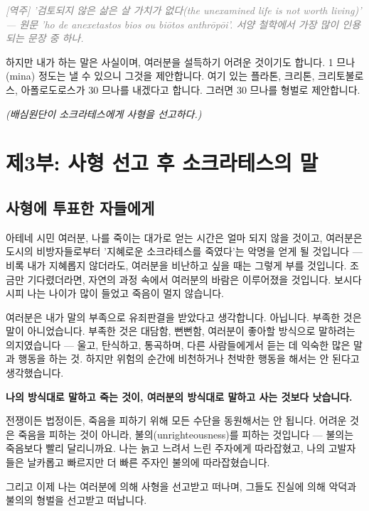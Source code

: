 \documentclass[11pt, a4paper]{article}
\newcommand{\tnote}[1]{\par\noindent\textit{\textcolor{gray}{[역주] #1}}\par\smallskip}
\begin{document}
\tnote{'검토되지 않은 삶은 살 가치가 없다(the unexamined life is not worth living)' — 원문 'ho de anexetastos bios ou biōtos anthrōpōi'. 서양 철학에서 가장 많이 인용되는 문장 중 하나.}


하지만 내가 하는 말은 사실이며, 여러분을 설득하기 어려운 것이기도 합니다. 1 므나(mina) 정도는 낼 수 있으니 그것을 제안합니다. 여기 있는 플라톤, 크리톤, 크리토불로스, 아폴로도로스가 30 므나를 내겠다고 합니다. 그러면 30 므나를 형벌로 제안합니다.


\begin{center}\textit{(배심원단이 소크라테스에게 사형을 선고하다.)}\end{center}


\bigskip


\newpage
\section{제3부: 사형 선고 후 소크라테스의 말}


\subsection{사형에 투표한 자들에게}


아테네 시민 여러분, 나를 죽이는 대가로 얻는 시간은 얼마 되지 않을 것이고, 여러분은 도시의 비방자들로부터 '지혜로운 소크라테스를 죽였다'는 악명을 얻게 될 것입니다 — 비록 내가 지혜롭지 않더라도, 여러분을 비난하고 싶을 때는 그렇게 부를 것입니다. 조금만 기다렸더라면, 자연의 과정 속에서 여러분의 바람은 이루어졌을 것입니다. 보시다시피 나는 나이가 많이 들었고 죽음이 멀지 않습니다.


여러분은 내가 말의 부족으로 유죄판결을 받았다고 생각합니다. 아닙니다. 부족한 것은 말이 아니었습니다. 부족한 것은 대담함, 뻔뻔함, 여러분이 좋아할 방식으로 말하려는 의지였습니다 — 울고, 탄식하고, 통곡하며, 다른 사람들에게서 듣는 데 익숙한 많은 말과 행동을 하는 것. 하지만 위험의 순간에 비천하거나 천박한 행동을 해서는 안 된다고 생각했습니다.


\textbf{나의 방식대로 말하고 죽는 것이, 여러분의 방식대로 말하고 사는 것보다 낫습니다.}


전쟁이든 법정이든, 죽음을 피하기 위해 모든 수단을 동원해서는 안 됩니다. 어려운 것은 죽음을 피하는 것이 아니라, 불의(unrighteousness)를 피하는 것입니다 — 불의는 죽음보다 빨리 달리니까요. 나는 늙고 느려서 느린 주자에게 따라잡혔고, 나의 고발자들은 날카롭고 빠르지만 더 빠른 주자인 불의에 따라잡혔습니다.


그리고 이제 나는 여러분에 의해 사형을 선고받고 떠나며, 그들도 진실에 의해 악덕과 불의의 형벌을 선고받고 떠납니다.
\end{document}
